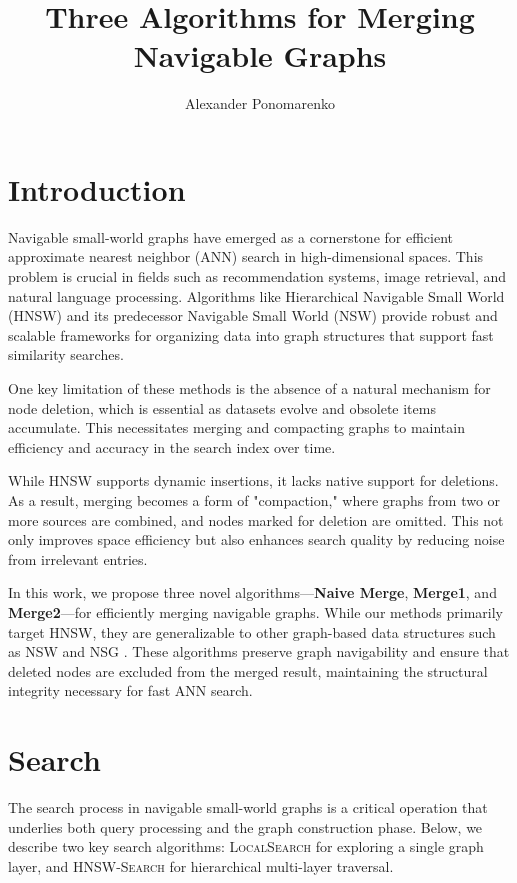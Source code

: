 \documentclass{article}
\title{Three Algorithms for Merging Navigable Graphs}
\author[1]{Alexander Ponomarenko}
\date{}
\affil[1]{HSE Univerity}
\begin{document}
\maketitle

\section{Introduction}
Navigable small-world graphs have emerged as a cornerstone for efficient approximate nearest neighbor (ANN) search in high-dimensional spaces. This problem is crucial in fields such as recommendation systems, image retrieval, and natural language processing. Algorithms like Hierarchical Navigable Small World (HNSW) \cite{hnsw} and its predecessor Navigable Small World (NSW) \cite{nsw2011,nsw2012,nsw2014} provide robust and scalable frameworks for organizing data into graph structures that support fast similarity searches.

One key limitation of these methods is the absence of a natural mechanism for node deletion, which is essential as datasets evolve and obsolete items accumulate. This necessitates merging and compacting graphs to maintain efficiency and accuracy in the search index over time.

While HNSW supports dynamic insertions, it lacks native support for deletions. As a result, merging becomes a form of "compaction," where graphs from two or more sources are combined, and nodes marked for deletion are omitted. This not only improves space efficiency but also enhances search quality by reducing noise from irrelevant entries.

In this work, we propose three novel algorithms—\textbf{Naive Merge}, \textbf{Merge1}, and \textbf{Merge2}—for efficiently merging navigable graphs. While our methods primarily target HNSW, they are generalizable to other graph-based data structures such as NSW \cite{nsw2011} and NSG \cite{NSG}. These algorithms preserve graph navigability and ensure that deleted nodes are excluded from the merged result, maintaining the structural integrity necessary for fast ANN search.

\section{Search}

The search process in navigable small-world graphs is a critical operation that underlies both query processing and the graph construction phase. Below, we describe two key search algorithms: \textsc{LocalSearch} for exploring a single graph layer, and \textsc{HNSW-Search} for hierarchical multi-layer traversal.
\end{document}
